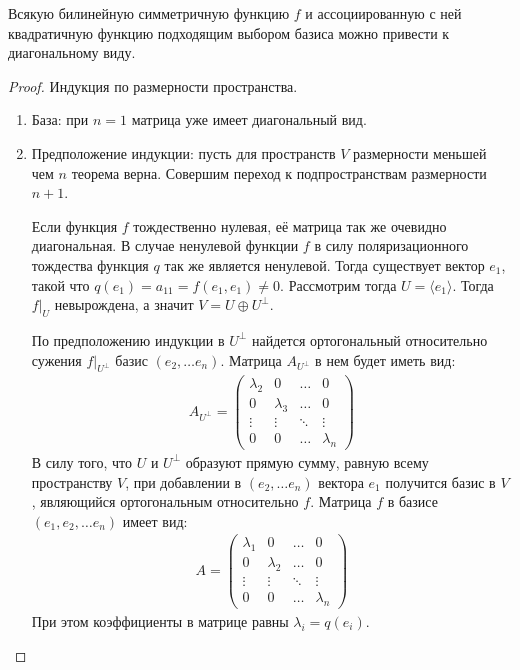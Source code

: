 \begin{theorem}[Лагранжа]
    Всякую билинейную симметричную функцию $f$ и ассоциированную с ней квадратичную функцию 
    подходящим выбором базиса можно привести к диагональному виду.
\end{theorem}

\begin{proof}
    Индукция по размерности пространства.
    \begin{enumerate}
        \item База: при $n=1$ матрица уже имеет диагональный вид.
        \item Предположение индукции: пусть для пространств $V$ размерности меньшей чем $n$ 
        теорема верна. Совершим переход к подпространствам размерности $n+1$.

        Если функция $f$ тождественно нулевая, её матрица так же очевидно диагональная. В случае ненулевой функции $f$ в силу поляризационного тождества функция $q$ так же является ненулевой. Тогда существует вектор $e_1$, такой что $q(e_1) = a_{11} = f(e_1, e_1) \neq 0$. Рассмотрим тогда $U = \langle e_1 \rangle$. Тогда $f \vert_{U}$ невырождена, а значит $V = U \oplus U^{\perp}$. 

        По предположению индукции в $U^{\perp}$ найдется ортогональный относительно сужения 
        $f \vert_{U^{\perp}}$ базис $(e_2, \dots e_n)$. Матрица $A_{U^{\perp}}$ в нем будет иметь вид:
        \begin{gather*}
            A_{U^{\perp}} = \begin{pmatrix}
                \lambda_2  & 0         & \dots  & 0         \\
                0          & \lambda_3 & \dots  & 0         \\
                \vdots     & \vdots    & \ddots & \vdots    \\
                0          & 0         & \dots  & \lambda_n
            \end{pmatrix}
        \end{gather*}
        В силу того, что $U$ и $U^{\perp}$ образуют прямую сумму, равную всему пространству $V$,
        при добавлении в $(e_2, \dots e_n)$ вектора $e_1$ получится базис в $V$, 
        являющийся ортогональным относительно $f$. Матрица $f$ в базисе $(e_1, e_2, \dots e_n)$ имеет 
        вид:
        \begin{gather*}
            A = \begin{pmatrix}
                \lambda_1  & 0         & \dots  & 0         \\
                0          & \lambda_2 & \dots  & 0         \\
                \vdots     & \vdots    & \ddots & \vdots    \\
                0          & 0         & \dots  & \lambda_n
            \end{pmatrix}
        \end{gather*}
        При этом коэффициенты в матрице равны $\lambda_i = q(e_i)$.
    \end{enumerate}
\end{proof}

